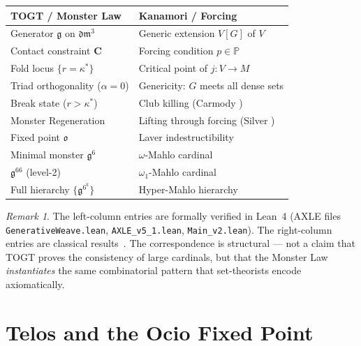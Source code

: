 \documentclass[12pt,a4paper]{amsart}
\theoremstyle{definition}
\theoremstyle{remark}
\newtheorem{remark}[theorem]{Remark}
\newcommand{\Cop}{\mathbf{C}}
\newcommand{\GG}{\mathfrak{g}}
\newcommand{\dm}{\mathfrak{dm}^3}
\newcommand{\kap}{\kappa^*}
\newcommand{\ocio}{\mathfrak{o}}
\begin{document}
\begin{tcolorbox}[kanamoriBox]
\begin{center}
\small
\begin{tabular}{@{}p{5.5cm}p{5.5cm}@{}}
\toprule
\textbf{TOGT / Monster Law} & \textbf{Kanamori / Forcing} \\
\midrule
Generator $\GG$ on $\dm$ & Generic extension $V[G]$ of $V$ \\[2pt]
Contact constraint $\Cop$ & Forcing condition $p \in \mathbb{P}$ \\[2pt]
Fold locus $\{r = \kap\}$ & Critical point of $j: V \to M$ \\[2pt]
Triad orthogonality ($\alpha=0$) & Genericity: $G$ meets all dense sets \\[2pt]
Break state ($r > \kap$) & Club killing (Carmody \cite{Carmody2015}) \\[2pt]
Monster Regeneration & Lifting through forcing (Silver \cite{Silver1971}) \\[2pt]
Fixed point $\ocio$ & Laver indestructibility \cite{Laver1978} \\[2pt]
Minimal monster $\GG^6$ & $\omega$-Mahlo cardinal \\[2pt]
$\GG^{66}$ (level-2) & $\omega_1$-Mahlo cardinal \\[2pt]
Full hierarchy $\{\GG^{6^k}\}$ & Hyper-Mahlo hierarchy \\
\bottomrule
\end{tabular}
\end{center}
\end{tcolorbox}

\begin{remark}
The left-column entries are formally verified in Lean~4 (AXLE files
\texttt{GenerativeWeave.lean}, \texttt{AXLE\_v5\_1.lean}, \texttt{Main\_v2.lean}).
The right-column entries are classical results~\cite{Kanamori2003}.
The correspondence is structural --- not a claim that TOGT proves the consistency
of large cardinals, but that the Monster Law \emph{instantiates} the same
combinatorial pattern that set-theorists encode axiomatically.
\end{remark}

\section{Telos and the Ocio Fixed Point}\label{sec:telos}
\end{document}

